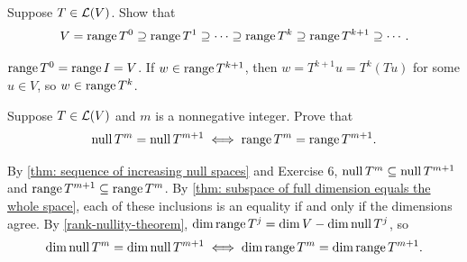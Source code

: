 \begin{xrcs}
  Suppose $T \in \mathcal{L}(V)$. Show that
  \begin{equation}
    V = \operatorname{range} T^0 \supseteq \operatorname{range} T^1 \supseteq \cdots \supseteq \operatorname{range} T^k \supseteq \operatorname{range} T^{k+1} \supseteq \cdots.
  \end{equation}

\begin{xprf}
  $\operatorname{range} T^0 = \operatorname{range} I = V$. If $w \in \operatorname{range} T^{k+1}$, then $w = T^{k+1} u = T^k (Tu)$ for some $u \in V$, so $w \in \operatorname{range} T^k$.
\end{xprf}
\end{xrcs}


\begin{xrcs}
  Suppose $T \in \mathcal{L}(V)$ and $m$ is a nonnegative integer. Prove that
  \begin{equation}
    \operatorname{null} T^m = \operatorname{null} T^{m+1} \iff \operatorname{range} T^m = \operatorname{range} T^{m+1}.
  \end{equation}

\begin{xprf}
  By \ref{thm: sequence of increasing null spaces} and Exercise 6, $\operatorname{null} T^m \subseteq \operatorname{null} T^{m+1}$ and $\operatorname{range} T^{m+1} \subseteq \operatorname{range} T^m$. By \ref{thm: subspace of full dimension equals the whole space}, each of these inclusions is an equality if and only if the dimensions agree. By \ref{rank-nullity-theorem}, $\dim \operatorname{range} T^j = \dim V - \dim \operatorname{null} T^j$, so
  \begin{equation}
    \dim \operatorname{null} T^m = \dim \operatorname{null} T^{m+1} \iff \dim \operatorname{range} T^m = \dim \operatorname{range} T^{m+1}.
  \end{equation}
  \vspace{-\baselineskip}
\end{xprf}
\end{xrcs}

